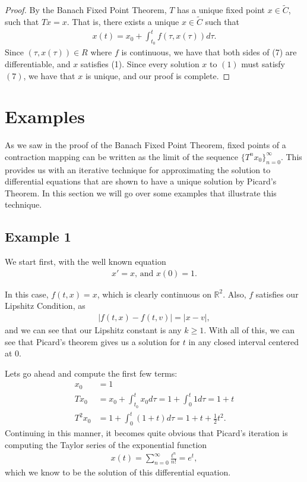 \documentclass[10pt,a4paper]{article}
\theoremstyle{theorem}
\theoremstyle{definition}
\begin{document}
\begin{proof}
By the Banach Fixed Point Theorem, $T$ has a unique fixed point $x \in \tilde{C}$, such that $Tx = x$. That is, there exists a unique $x \in \tilde{C}$ such that 
\begin{align}
x(t) = x_0 + \int_{t_0}^{t} f(\tau, x(\tau))d \tau.
\end{align}
Since $(\tau, x(\tau)) \in R$ where $f$ is continuous, we have that both sides of (7) are differentiable,  and $x$ satisfies (1).  Since every solution $x$ to $(1)$ must satisfy $(7)$,  we have that $x$ is unique, and our proof is complete.
\end{proof}

\section*{Examples}
As we saw in the proof of the Banach Fixed Point Theorem, fixed points of a contraction mapping can be written as the limit of the sequence $\{T^n x_0 \}_{n = 0}^\infty$. This provides us with an iterative technique for approximating the solution to differential equations that are shown to have a unique solution by Picard's Theorem. In this section we will go over some examples that illustrate this technique.

\subsection*{Example 1}
We start first, with the well known equation
\begin{align*}
x' = x \text{,  and } x(0) = 1.
\end{align*}

In this case, $f(t, x) = x$, which is clearly continuous on $\mathbb{R}^2$.  Also, $f$ satisfies our Lipshitz Condition, as
\begin{align*}
|f(t, x) - f(t, v)| = |x - v|,
\end{align*}
and we can see that our Lipshitz constant is any $k \geq 1$. With all of this, we can see that Picard's theorem gives us a solution for $t$ in any closed interval centered at $0$.

Lets go ahead and compute the first few terms:
\begin{align*}
x_0 &= 1\\
Tx_0 &= x_0 + \int_{t_0}^{t} x_0 d \tau = 1 +  \int_{0}^{t} 1 d \tau = 1 + t\\
T^{2} x_0 &= 1 +  \int_{0}^{t} (1 + t) d \tau = 1 + t + \frac{1}{2}t^2 .
\end{align*}
Continuing in this manner, it becomes quite obvious that Picard's iteration is computing the Taylor series of the exponential function
\begin{align*}
x(t) = \sum_{n = 0}^\infty \frac{t^n}{n !} = e^t,
\end{align*}
which we know to be the solution of this differential equation.
\end{document}

